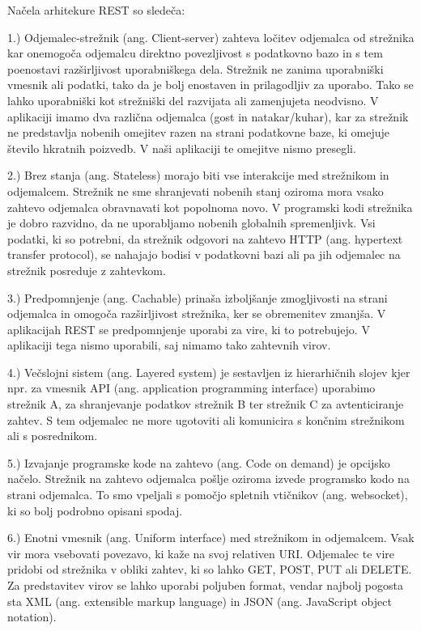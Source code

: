 \documentclass[a4paper, 12pt]{book}
\begin{document}
Načela arhitekure REST so sledeča:

1.) Odjemalec-strežnik (ang. Client-server) zahteva ločitev odjemalca od strežnika kar onemogoča odjemalcu direktno povezljivost s podatkovno bazo in s tem poenostavi razširljivost uporabniškega dela. Strežnik ne zanima uporabniški vmesnik ali podatki, tako da je bolj enostaven in prilagodljiv za uporabo. Tako se lahko uporabniški kot strežniški del razvijata ali zamenjujeta neodvisno. V aplikaciji imamo dva različna odjemalca (gost in natakar/kuhar), kar za strežnik ne predstavlja nobenih omejitev razen na strani podatkovne baze, ki omejuje število hkratnih poizvedb. V naši aplikaciji te omejitve nismo presegli.

2.) Brez stanja (ang. Stateless) morajo biti vse interakcije med strežnikom in odjemalcem. Strežnik ne sme shranjevati nobenih stanj oziroma mora vsako zahtevo odjemalca obravnavati kot popolnoma novo. V programski kodi strežnika je dobro razvidno, da ne uporabljamo nobenih globalnih spremenljivk. Vsi podatki, ki so potrebni, da strežnik odgovori na zahtevo HTTP (ang. hypertext transfer protocol), se nahajajo bodisi v podatkovni bazi ali pa jih odjemalec na strežnik posreduje z zahtevkom.

3.) Predpomnjenje (ang. Cachable) prinaša izboljšanje zmogljivosti na strani odjemalca in omogoča razširljivost strežnika, ker se obremenitev zmanjša. V aplikacijah REST se predpomnjenje uporabi za vire, ki to potrebujejo. V aplikaciji tega nismo uporabili, saj nimamo tako zahtevnih virov.

4.) Večslojni sistem (ang. Layered system) je sestavljen iz hierarhičnih slojev kjer npr. za vmesnik API (ang. application programming interface) uporabimo strežnik A, za shranjevanje podatkov strežnik B ter strežnik C za avtenticiranje zahtev. S tem odjemalec ne more ugotoviti ali komunicira s končnim strežnikom ali s posrednikom.

5.) Izvajanje programske kode na zahtevo (ang. Code on demand) je opcijsko načelo. Strežnik na zahtevo odjemalca pošlje oziroma izvede programsko kodo na strani odjemalca. To smo vpeljali s pomočjo spletnih vtičnikov (ang. websocket), ki so bolj podrobno opisani spodaj.

6.) Enotni vmesnik (ang. Uniform interface) med strežnikom in odjemalcem. Vsak vir mora vsebovati povezavo, ki kaže na svoj relativen URI. Odjemalec te vire pridobi od strežnika v obliki zahtev, ki so lahko GET, POST, PUT ali DELETE. Za predstavitev virov se lahko uporabi poljuben format, vendar najbolj pogosta sta XML (ang. extensible markup language) in JSON (ang. JavaScript object notation).
\end{document}
